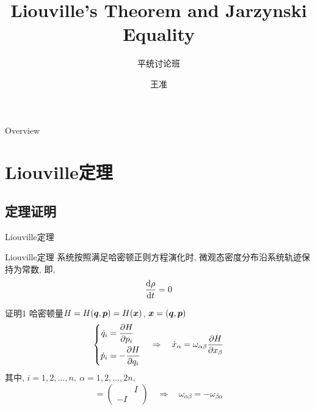 \documentclass[aspectratio=169]{wzbeamer}
\title{Liouville's Theorem and Jarzynski Equality}
\subtitle{平统讨论班}
\author{王准}
\institute[pku]{北京大学}
\begin{document}
\maketitle 
    
\begin{frame}{Overview}
    \tableofcontents
\end{frame}


\section{Liouville定理}
    \subsection{定理证明}
    \begin{frame}{Liouville定理}
        \begin{alertblock}{Liouville定理}
            系统按照满足哈密顿正则方程演化时, 微观态密度分布沿系统轨迹保持为常数, 即,
            \begin{equation}
                \dv{\rho}{t} = 0
            \end{equation}
        \end{alertblock}

    \end{frame}
    \begin{frame}{证明1}
        哈密顿量$H = H(\vb*q, \vb*p) = H(\vb*x)$, $\vb*x = (\vb*q, \vb*p)$
        \begin{equation}
            \left\{
            \begin{split}
                \dot{q}_i &= \pdv{H}{p_i}\\
                \dot{p}_i &= - \pdv{H}{q_i}
            \end{split}
            \right.\quad
            \Rightarrow\quad
            \dot{x}_\alpha = \omega_{\alpha\beta} \pdv{H}{x_\beta}
        \end{equation}
        其中, $i = 1,2,\dots,n, \ \alpha = 1,2,\dots,2n$, 
        \begin{equation}
            [\omega_{\alpha\beta}] = 
            \begin{pmatrix}
                & I \\
                -I & 
            \end{pmatrix}
            \quad\Rightarrow\quad
            \omega_{\alpha\beta} = -\omega_{\beta\alpha}
        \end{equation}
    \end{frame}
    
\end{document}
